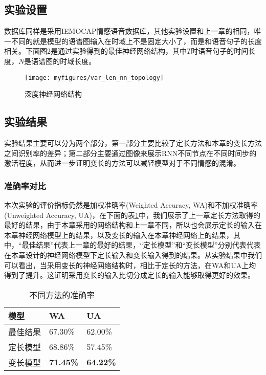\subsection{实验设置}
\label{sec:var_len_experiement_setup}

数据库同样是采用IEMOCAP情感语音数据库，其他实验设置和上一章的相同，唯一不同的就是模型的语谱图输入在时域上不是固定大小了，而是和语音句子的长度相关。下面图2是通过实验得到的最佳神经网络结构，其中$T$时语音句子的时间长度，$N$是语谱图的时域长度。

\begin{figure}[htb] %
    \centering
    \texttt{[image: myfigures/var\_len\_nn\_topology]}
    \caption{深度神经网络结构}
    \label{fig:var_len_nn_topology}
\end{figure}

\subsection{实验结果}
\label{sec:var_len_experiement_result}

实验结果主要可以分为两个部分，第一部分主要比较了定长方法和本章的变长方法之间识别率的差异；第二部分主要通过图像来展示RNN不同节点在不同时间步的激活程度，从而进一步证明变长的方法可以减轻模型对于不同情感的混淆。

\subsubsection{准确率对比}
\label{sec:var_len_experiement_acc}
本次实验的评价指标仍然是加权准确率(Weighted Accuracy, WA)和不加权准确率(Unweighted Accuracy, UA)，在下面的表\ref{tab:acc_var_len}中，我们展示了上一章定长方法取得的最好的结果，由于本章采用的网络结构和上一章不同，所以也会展示定长的输入在本章神经网络模型上的结果，以及变长的输入在本章神经网络上的结果，其中，“最佳结果”代表上一章的最好的结果，“定长模型”和“变长模型”分别代表代表在本章设计的神经网络模型下定长输入和变长输入得到的结果。从实验结果中我们可以看出，当采用变长的神经网络结构时，相比于定长的方法，在WA和UA上均得到了提升。这证明采用变长的输入比切分成定长的输入能够取得更好的效果。
\begin{table}[htb]
\centering
\begin{minipage}[t]{0.8\linewidth} %
\caption{不同方法的准确率}
\label{tab:acc_var_len}
    \begin{tabularx}{\linewidth}{X<{\centering} X<{\centering} X<{\centering}}
        \toprule[1.5pt]
        模型 & WA & UA \\
        \midrule[1pt]
        最佳结果 & 67.30\% & 62.00\% \\
        定长模型 & 68.86\% & 57.45\% \\
        变长模型 & \textbf{71.45\%} & \textbf{64.22\%} \\
        \bottomrule[1.5pt]
    \end{tabularx}
\end{minipage}
\end{table}


